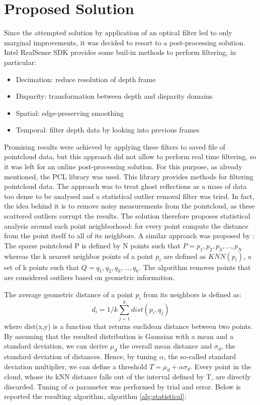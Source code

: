 \section{Proposed Solution}
Since the attempted solution by application of an optical filter led to only marginal improvements, it was decided to resort to a post-processing solution.
Intel RealSense SDK provides some buil-in methods to perform filtering, in particular:
\begin{itemize}
    \item Decimation: reduce resolution of depth frame
    \item Disparity: transformation between depth and disparity domains
    \item Spatial: edge-preserving smoothing
    \item Temporal: filter depth data by looking into previous frames
\end{itemize}
Promising results were achieved by applying these filters to saved file of pointcloud data, but this approach did not allow to perform real time filtering, so it was left for an online post-processing solution.
For this purpose, as already mentioned, the PCL library was used.
This library provides methods for filtering pointcloud data.
The approach was to treat ghost reflections as a mass of data too dense to be analysed and a statistical outlier removal filter was tried.
In fact, the idea behind it is to remove noisy measurements from the pointcloud, as these scattered outliers corrupt the results.
The solution therefore proposes statistical analysis around each point neighborhood: for every point compute the distance from the point itself to all of its neighbors.
A similar approach was proposed by \citet{Ning2018AnEO}:
The sparse pointcloud P is defined by N points such that $P = p_{1}, p_{2}, p_{3}, ..., p_{N}$ whereas the k nearest neighbor points of a point $p_{i}$ are defined as $KNN(p_{i})$, a set of k points such that $Q = q_{1}, q_{2}, q_{3}, ..., q_{k}$.
The algorithm removes points that are considered outliers based on geometric information.

The average geometric distance of a point $p_i$ from its neighbors is defined as:
\begin{equation}
 d_i = 1/k \sum_{j=1}^{k} dist(p_i,q_j)
\end{equation}
where dist(x,y) is a function that returns euclidean distance between two points. 
By assuming that the resulted distribution is Gaussian with a mean and a standard deviation, we can derive $\mu_d$ the overall mean distance and $\sigma_d$, the standard deviation of distances.
Hence, by tuning $\alpha$, the so-called standard deviation multiplier, we can define a threshold $T = \mu_d + \alpha \sigma_d$. 
Every point in the cloud, whose its kNN distance falls out of the interval defined by T, are directly discarded.
Tuning of $\alpha$ parameter was performed by trial and error.
Below is reported the resulting algorithm, algorithm \ref{alg:statistical}:


